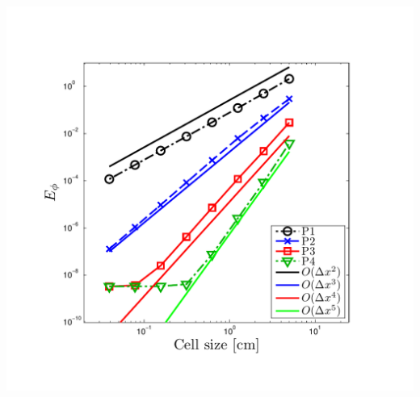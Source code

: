 \documentclass{beamer}
\begin{document}
\begin{frame}
\begin{columns}[t]
\includegraphics[width=\textwidth,trim=0.25in  0.2in 0.75in 0.5in,clip=true]{../chapter6_grey_radtran/Dissertation_Data/MMS3_SLXS_Gauss_phi_L2.pdf}
\end{columns}
\end{frame}
\end{document}
